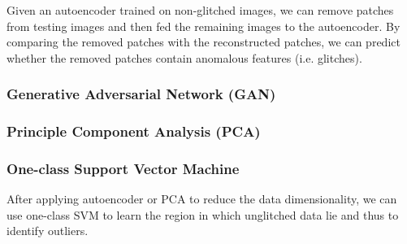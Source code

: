 \documentclass[12pt]{article}
\begin{document}
\noindent Given an autoencoder trained on non-glitched images, we can remove patches from testing images and then fed the remaining images to the autoencoder. By comparing the removed patches with the reconstructed patches, we can predict whether the removed patches contain anomalous features (i.e. glitches). 

\subsubsection{Generative Adversarial Network (GAN)}


\subsubsection{Principle Component Analysis (PCA)}

\subsubsection{One-class Support Vector Machine}
After applying autoencoder or PCA to reduce the data dimensionality, we can use one-class SVM to learn the region in which unglitched data lie and thus to identify outliers.
\end{document}
